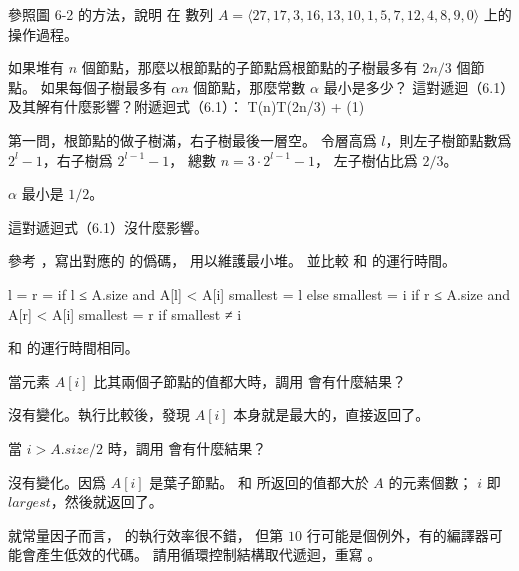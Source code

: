 \startsection[
  title={Maintaining the heap property},
]

\startEXERCISE
參照圖 6-2 的方法，說明  在
數列 $A = \langle 27,17,3,16,13,10,1,5,7,12,4,8,9,0\rangle$ 上的操作過程。
\stopEXERCISE

\startANSWER
\startcombination[2*2]
{\externalfigure[e6_2_1-1]}{}
{\externalfigure[e6_2_1-2]}{}
{\externalfigure[e6_2_1-3]}{}
{}{}
\stopcombination
\stopANSWER

\startEXERCISE
如果堆有 $n$ 個節點，那麼以根節點的子節點爲根節點的子樹最多有 $2n/3$ 個節點。
如果每個子樹最多有 $\alpha n$ 個節點，那麼常數 $\alpha$ 最小是多少？
這對遞迴（6.1）及其解有什麼影響？附遞迴式（6.1）：
\startformula
T(n)\le T(2n/3) + \Theta(1)
\stopformula
\stopEXERCISE

\startANSWER
第一問，根節點的做子樹滿，右子樹最後一層空。
令層高爲 $l$，則左子樹節點數爲 $2^l - 1$，右子樹爲 $2^{l-1} - 1$，
總數 $n=3 \cdot 2^{l-1} - 1$，
左子樹佔比爲 $2/3$。

$\alpha$ 最小是 $1/2$。

這對遞迴式（6.1）沒什麼影響。
\stopANSWER

\startEXERCISE
參考 ，寫出對應的  的僞碼，
用以維護最小堆。
並比較  和  的運行時間。
\stopEXERCISE

\startANSWER
{}
\startCLRSCODE
l = 
r = 
if l ≤ A.size and A[l] < A[i]
	smallest = l
else
	smallest = i
if r ≤ A.size and A[r] < A[i]
	smallest = r
if smallest ≠ i
\stopCLRSCODE

 和  的運行時間相同。
\stopANSWER

\startEXERCISE
當元素 $A[i]$ 比其兩個子節點的值都大時，調用  會有什麼結果？
\stopEXERCISE

\startANSWER
沒有變化。執行比較後，發現 $A[i]$ 本身就是最大的，直接返回了。
\stopANSWER

\startEXERCISE
當 $i > A.size / 2$ 時，調用  會有什麼結果？
\stopEXERCISE

\startANSWER
沒有變化。因爲 $A[i]$ 是葉子節點。  和  所返回的值都大於 $A$ 的元素個數；
 $i$ 即 $largest$，然後就返回了。
\stopANSWER

\startEXERCISE
就常量因子而言，  的執行效率很不錯，
但第 $10$ 行可能是個例外，有的編譯器可能會產生低效的代碼。
請用循環控制結構取代遞迴，重寫 。
\stopEXERCISE

